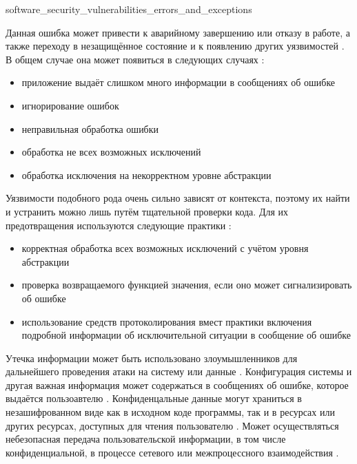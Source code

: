 	{software_security_vulnerabilities_errors_and_exceptions}

%
Данная ошибка может привести к аварийному завершению или отказу  в работе, 
а также переходу в незащищённое состояние и к появлению других уязвимостей . 
%
В общем случае она может появиться в следующих случаях :
\begin{itemize}
	\item приложение выдаёт слишком много информации в сообщениях об ошибке 
	\item игнорирование ошибок 
	\item неправильная обработка ошибки 
	\item обработка не всех возможных исключений 
	\item обработка исключения на некорректном уровне абстракции 
\end{itemize}

%
Уязвимости подобного рода очень сильно зависят от контекста, поэтому их найти и устранить можно 
лишь путём тщательной проверки кода. 
%
Для их предотвращения используются следующие практики : 
\begin{itemize}
	\item корректная обработка всех возможных исключений с учётом уровня абстракции 
	\item проверка возвращаемого функцией значения, если оно может сигнализировать об ошибке 
	\item использование средств протоколирования вмест практики включения подробной информации 
		об исключительной ситуации в сообщение об ошибке 
\end{itemize}


%
Утечка информации может быть использовано злоумышленников для дальнейшего проведения атаки 
на систему или данные . 
%
Конфигурация системы и другая важная информация  может содержаться в сообщениях об ошибке, которое 
выдаётся пользоавтелю . 
%
Конфиденцальные данные могут храниться в незашифрованном виде как в исходном коде программы, так и 
в ресурсах или других ресурсах, доступных для чтения пользователю . 
%
Может осуществляться небезопасная передача пользовательской  информации, в том числе 
конфиденциальной, в процессе сетевого или межпроцессного взаимодействия .

